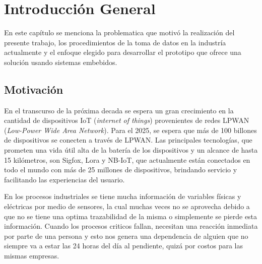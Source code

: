
\chapter{Introducción General} %
En este capítulo se menciona la problematica que motivó la realización del presente trabajo, los procedimientos de la toma de datos en la industría actualmente y el enfoque elegido para desarrollar el prototipo que ofrece una solución usando sistemas embebidos.
\label{Chapter1} %
\label{IntroGeneral}


\newcommand{\keyword}[1]{\textbf{#1}}
\newcommand{\tabhead}[1]{\textbf{#1}}
\newcommand{\code}[1]{\texttt{#1}}
\newcommand{\file}[1]{\texttt{\bfseries#1}}
\newcommand{\option}[1]{\texttt{\itshape#1}}
\newcommand{\grados}{$^{\circ}$}



\section{Motivación}
En el transcurso de la próxima decada se espera un gran crecimiento en la cantidad de dispositivos IoT (\textit{internet of things}) provenientes de redes LPWAN (\textit{Low-Power Wide Area Network}). Para el 2025, se espera que más de 100 billones de dispositivos se conecten a través de LPWAN\cite{taylor2015world}. Las principales tecnologías, que prometen una vida útil alta de la batería de los dispositivos y un alcance de hasta 15 kilómetros, son Sigfox, Lora y NB-IoT, que actualmente están conectados en todo el mundo con más de 25 millones de dispositivos, brindando servicio y facilitando las experiencias del usuario.

En los procesos industriales se tiene mucha información de variables físicas y eléctricas por medio de sensores, la cual muchas veces no se aprovecha debido a que no se tiene una optima trazabilidad de la misma o simplemente se pierde esta información. Cuando los procesos criticos fallan, necesitan una reacción inmediata por parte de una persona y esto nos genera una dependencia de alguien que no siempre va a estar las 24 horas del día al pendiente, quizá por costos para las mismas empresas.

